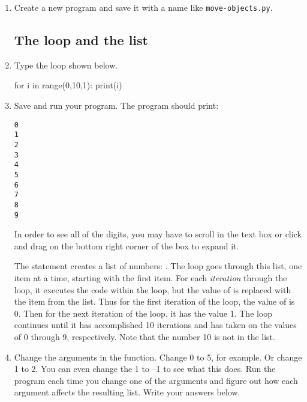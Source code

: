 \begin{enumerate}

	\item Create a new program and save it with a name like  \texttt{move-objects.py}. 
	
\subsection*{The  loop and the  list}

\item Type the  loop shown below.

\begin{myvpython}
for i in range(0,10,1):
    print(i)
\end{myvpython}
    
\item Save and run your program. The program should print:

\begin{verbatim}
0
1
2
3
4
5
6
7
8
9
\end{verbatim}

In order to see all of the digits, you may have to scroll in the text box or click and drag on the bottom right corner of the box to expand it.

The statement  creates a list of numbers: . The  loop goes through this list, one item at a time, starting with the first item. For each \emph{iteration} through the loop, it executes the code within the loop, but the value of  is replaced with the item from the list. Thus for the first iteration of the loop, the value of  is 0. Then for the next iteration of the loop, it has the value 1. The loop continues until it has accomplished 10 iterations and  has taken on the values of 0 through 9, respectively. Note that the number 10 is not in the list.

\item Change the arguments in the  function. Change 0 to 5, for example. Or change 1 to 2. You can even change the 1 to --1 to see what this does. Run the program each time you change one of the arguments and figure out how each argument affects the resulting list. Write your answers below.

\end{enumerate}
